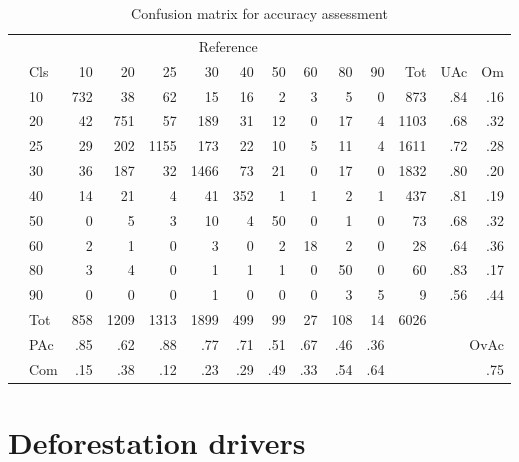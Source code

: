		\begin{table}[ht]
			\centering
			\caption[Accuracy assessment]{Confusion matrix for accuracy assessment}
			\label{tab:accuracy}
			\begin{tabular}{ll|rrrrrrrrr|rrr}
				& & \multicolumn{9}{c|}{Reference} & & & \\
				& Cls & 10 & 20 & 25 & 30 & 40 & 50 & 60 & 80 & 90 & Tot & UAc & Om \\\hline
				\multirow{9}{*}{\STAB{\rotatebox[origin=c]{90}{Prediction}}}
				& 10 & 732 & 38 & 62 & 15 & 16 & 2 & 3 & 5 & 0 & 873 & .84 & .16 \\ 
				& 20 & 42 & 751 & 57 & 189 & 31 & 12 & 0 & 17 & 4 & 1103 & .68 & .32 \\ 
				& 25 & 29 & 202 & 1155 & 173 & 22 & 10 & 5 & 11 & 4 & 1611 & .72 & .28 \\ 
				& 30 & 36 & 187 & 32 & 1466 & 73 & 21 & 0 & 17 & 0 & 1832 & .80 & .20 \\ 
				& 40 & 14 & 21 & 4 & 41 & 352 & 1 & 1 & 2 & 1 & 437 & .81 & .19 \\ 
				& 50 & 0 & 5 & 3 & 10 & 4 & 50 & 0 & 1 & 0 & 73 & .68 & .32 \\ 
				& 60 & 2 & 1 & 0 & 3 & 0 & 2 & 18 & 2 & 0 & 28 & .64 & .36 \\ 
				& 80 & 3 & 4 & 0 & 1 & 1 & 1 & 0 & 50 & 0 & 60 & .83 & .17 \\ 
				& 90 & 0 & 0 & 0 & 1 & 0 & 0 & 0 & 3 & 5 & 9 & .56 & .44 \\\hline 
				& Tot & 858 & 1209 & 1313 & 1899 & 499 & 99 & 27 & 108 & 14 & 6026 & & \\
				& PAc & .85 & .62 & .88 & .77 & .71 & .51 & .67 & .46 & .36 & & \multicolumn{2}{r}{OvAc} \\
				& Com & .15 & .38 & .12 & .23 & .29 & .49 & .33 & .54 & .64 & & \multicolumn{2}{r}{.75} \\ 
			\end{tabular}
		\end{table}

\newpage

	\section{Deforestation drivers}
	\label{sec:driver}


